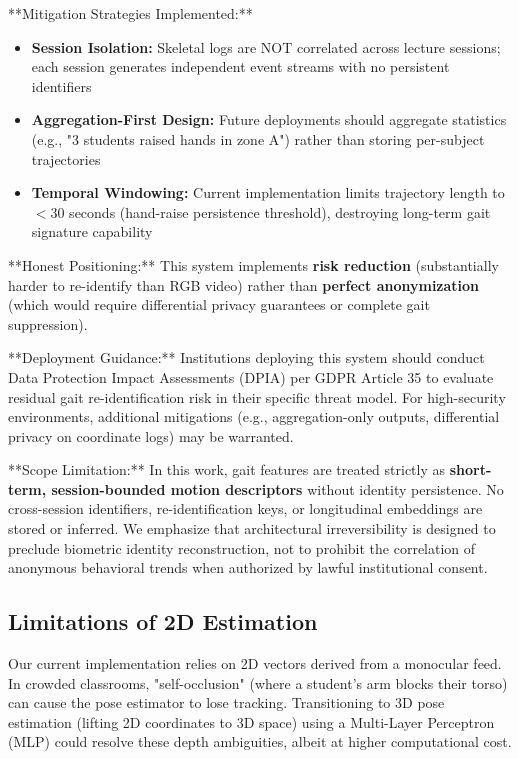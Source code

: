 \documentclass[conference]{IEEEtran}
\begin{document}
**Mitigation Strategies Implemented:**
\begin{itemize}
    \item \textbf{Session Isolation:} Skeletal logs are NOT correlated across lecture sessions; each session generates independent event streams with no persistent identifiers
    \item \textbf{Aggregation-First Design:} Future deployments should aggregate statistics (e.g., "3 students raised hands in zone A") rather than storing per-subject trajectories
    \item \textbf{Temporal Windowing:} Current implementation limits trajectory length to $<$30 seconds (hand-raise persistence threshold), destroying long-term gait signature capability
\end{itemize}

**Honest Positioning:** This system implements \textbf{risk reduction} (substantially harder to re-identify than RGB video) rather than \textbf{perfect anonymization} (which would require differential privacy guarantees or complete gait suppression). 

**Deployment Guidance:** Institutions deploying this system should conduct Data Protection Impact Assessments (DPIA) per GDPR Article 35 to evaluate residual gait re-identification risk in their specific threat model. For high-security environments, additional mitigations (e.g., aggregation-only outputs, differential privacy on coordinate logs) may be warranted.

**Scope Limitation:** In this work, gait features are treated strictly as \textbf{short-term, session-bounded motion descriptors} without identity persistence. No cross-session identifiers, re-identification keys, or longitudinal embeddings are stored or inferred. We emphasize that architectural irreversibility is designed to preclude biometric identity reconstruction, not to prohibit the correlation of anonymous behavioral trends when authorized by lawful institutional consent.

\subsection{Limitations of 2D Estimation}
Our current implementation relies on 2D vectors derived from a monocular feed. In crowded classrooms, "self-occlusion" (where a student's arm blocks their torso) can cause the pose estimator to lose tracking. Transitioning to 3D pose estimation (lifting 2D coordinates to 3D space) using a Multi-Layer Perceptron (MLP) could resolve these depth ambiguities, albeit at higher computational cost.
\end{document}
